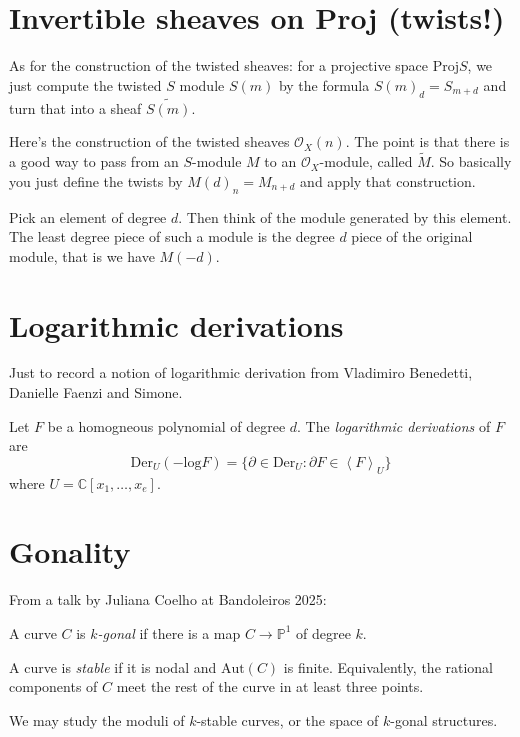 \section{Invertible sheaves on Proj (twists!)}
\label{section-invertible-on-proj}

\noindent
As for the construction of the twisted sheaves:
for a projective space $\text{Proj} S$,
we just compute the twisted $S$ module
$S(m)$ by the formula $S(m)_d=S_{m+d}$ 
and turn that into a sheaf $\widetilde{S(m)}$.

Here's the construction of the twisted
sheaves $\mathcal{O}_X(n)$.
The point is that there is a good way
to pass from an $S$-module $M$ to an
$\mathcal{O}_X$-module, called $\widetilde{M}$.
So basically you just define the twists
by $M(d)_n=M_{n+d}$ and apply that construction.

Pick an element of degree $d$.
Then think of the module generated by this element.
The least degree piece of such a module
is the degree $d$ piece of the original module,
that is we have $M(-d)$.


\section{Logarithmic derivations}
\label{section-logarithmic-derivations}

\noindent
Just to record a notion of logarithmic derivation
from Vladimiro Benedetti, Danielle Faenzi and Simone.

Let $F$ be a homogneous polynomial of degree $d$.
The {\it logarithmic derivations} of $F$ are
$$
\text{Der}_U(-\text{log}F)
=\{\partial \in \text{Der}_U
:\partial F \in \left<F\right>_U\}
$$
where $U=\mathbb{C}[x_1,…,x_e]$.

\section{Gonality}
\label{section-gonality}

\noindent
From a talk by Juliana Coelho at Bandoleiros 2025:

A curve $C$ is {\it $k$-gonal} if there is a map $C \to \mathbb{P}^1$ of degree $k$.

A curve is {\it stable} if it is nodal and $\text{Aut}(C)$ is finite.
Equivalently, the rational components of $C$ meet the
rest of the curve in at least three points.

We may study the moduli of $k$-stable curves,
or the space of $k$-gonal structures.

